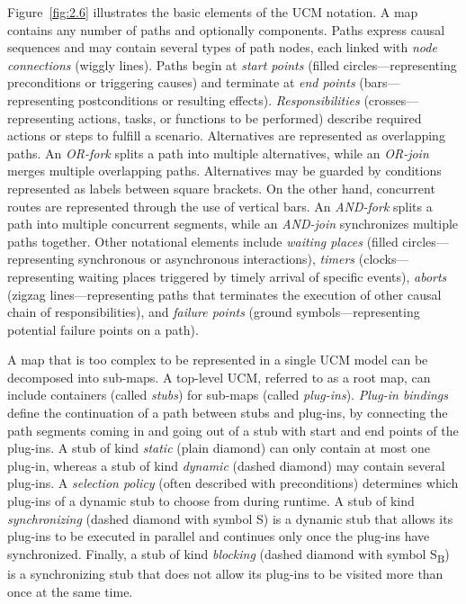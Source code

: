 Figure~\ref{fig:2.6} illustrates the basic elements of the UCM notation. A map contains any number of paths and optionally components. Paths express causal sequences and may contain several types of path nodes, each linked with \emph{node connections} (wiggly lines). Paths begin at \emph{start points} (filled circles---representing preconditions or triggering causes) and terminate at \emph{end points} (bars---representing postconditions or resulting effects). \emph{Responsibilities} (crosses---representing actions, tasks, or functions to be performed) describe required actions or steps to fulfill a scenario. Alternatives are represented as overlapping paths. An \emph{OR-fork} splits a path into multiple alternatives, while an \emph{OR-join} merges multiple overlapping paths. Alternatives may be guarded by conditions represented as labels between square brackets. On the other hand, concurrent routes are represented through the use of vertical bars. An \emph{AND-fork} splits a path into multiple concurrent segments, while an \emph{AND-join} synchronizes multiple paths together. Other notational elements include \emph{waiting places} (filled circles---representing synchronous or asynchronous interactions), \emph{timers} (clocks---representing waiting places triggered by timely arrival of specific events), \emph{aborts} (zigzag lines---representing paths that terminates the execution of other causal chain of responsibilities), and \emph{failure points} (ground symbols---representing potential failure points on a path).

A map that is too complex to be represented in a single UCM model can be decomposed into sub-maps. A top-level UCM, referred to as a root map, can include containers (called \emph{stubs}) for sub-maps (called \emph{plug-ins}). \emph{Plug-in bindings} define the continuation of a path between stubs and plug-ins, by connecting the path segments coming in and going out of a stub with start and end points of the plug-ins. A stub of kind \emph{static} (plain diamond) can only contain at most one plug-in, whereas a stub of kind \emph{dynamic} (dashed diamond) may contain several plug-ins. A \emph{selection policy} (often described with preconditions) determines which plug-ins of a dynamic stub to choose from during runtime. A stub of kind \emph{synchronizing} (dashed diamond with symbol S) is a dynamic stub that allows its plug-ins to be executed in parallel and continues only once the plug-ins have synchronized. Finally, a stub of kind \emph{blocking} (dashed diamond with symbol S\textsubscript{B}) is a synchronizing stub that does not allow its plug-ins to be visited more than once at the same time.

